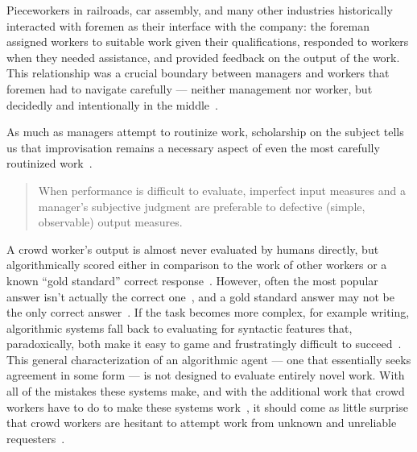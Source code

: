 \documentclass[main]{subfiles}
\begin{document}
Pieceworkers in
railroads, car assembly, and many other industries
historically interacted with foremen as their interface with the company:
the foreman assigned workers to suitable work given their qualifications,
responded to workers when they needed assistance, and
provided feedback on the output of the work.
This relationship was a crucial boundary between
managers and workers that foremen had to navigate carefully
--- neither management nor worker, but decidedly and intentionally in the middle~\cite{10.2307/44135127}.

As much as managers attempt to routinize work,
scholarship on the subject tells us that %
improvisation remains a necessary aspect of even the most carefully routinized work~\cite{american1921problem,doi:10.1287/orsc.10.1.43}.

\begin{quote}
  When performance is difficult to evaluate,
  imperfect input measures and a manager's subjective judgment are preferable to defective
  (simple, observable) output measures. 
\end{quote}

A crowd worker's output is almost never evaluated by humans directly, but
algorithmically scored either in comparison to the work of other workers or
a known ``gold standard'' correct response~\cite{le2010ensuring}.
However,
often the most popular answer isn't actually the correct one~\cite{prelec2004bayesian}, and
a gold standard answer may not be the only correct answer~\cite{kairam2016parting}.
If the task becomes more complex,
for example writing,
algorithmic systems fall back to evaluating for syntactic features that,
paradoxically, both make it easy to game and frustratingly difficult to succeed~\cite{winerip2012facing}.
This general characterization of an algorithmic agent
--- one that essentially seeks agreement in some form ---
is not designed to evaluate entirely novel work.
With all of the mistakes these systems make, and
with the additional work that crowd workers have to do to make these systems work~\cite{taskSearch},
it should come as little surprise that
crowd workers are hesitant to attempt work from unknown and unreliable requesters~\cite{takingAHITMcInnis}.
\end{document}
